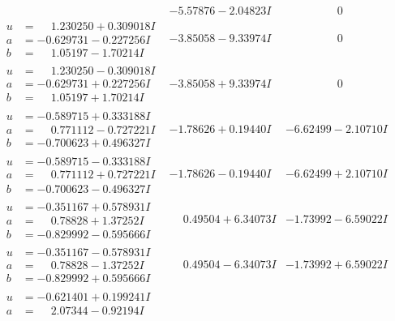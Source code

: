 \documentclass[1p]{elsarticle_modified}
\theoremstyle{definition}
\begin{document}
$$\begin{array}{c|c|c}
 & -5.57876 - 2.04823 I & \phantom{-0.000000 } 0 \\ \hline\begin{aligned}
u &= \phantom{-}1.230250 + 0.309018 I \\
a &= -0.629731 - 0.227256 I \\
b &= \phantom{-}1.05197 - 1.70214 I\end{aligned}
 & -3.85058 - 9.33974 I & \phantom{-0.000000 } 0 \\ \hline\begin{aligned}
u &= \phantom{-}1.230250 - 0.309018 I \\
a &= -0.629731 + 0.227256 I \\
b &= \phantom{-}1.05197 + 1.70214 I\end{aligned}
 & -3.85058 + 9.33974 I & \phantom{-0.000000 } 0 \\ \hline\begin{aligned}
u &= -0.589715 + 0.333188 I \\
a &= \phantom{-}0.771112 - 0.727221 I \\
b &= -0.700623 + 0.496327 I\end{aligned}
 & -1.78626 + 0.19440 I & -6.62499 - 2.10710 I \\ \hline\begin{aligned}
u &= -0.589715 - 0.333188 I \\
a &= \phantom{-}0.771112 + 0.727221 I \\
b &= -0.700623 - 0.496327 I\end{aligned}
 & -1.78626 - 0.19440 I & -6.62499 + 2.10710 I \\ \hline\begin{aligned}
u &= -0.351167 + 0.578931 I \\
a &= \phantom{-}0.78828 + 1.37252 I \\
b &= -0.829992 - 0.595666 I\end{aligned}
 & \phantom{-}0.49504 + 6.34073 I & -1.73992 - 6.59022 I \\ \hline\begin{aligned}
u &= -0.351167 - 0.578931 I \\
a &= \phantom{-}0.78828 - 1.37252 I \\
b &= -0.829992 + 0.595666 I\end{aligned}
 & \phantom{-}0.49504 - 6.34073 I & -1.73992 + 6.59022 I \\ \hline\begin{aligned}
u &= -0.621401 + 0.199241 I \\
a &= \phantom{-}2.07344 - 0.92194 I \\

\end{aligned}
\end{array}$$
\end{document}
